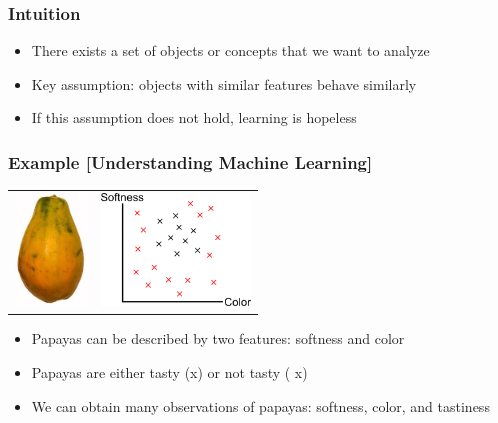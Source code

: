 \documentclass[10pt]{beamer}
\begin{document}
\begin{frame}
  \frametitle{Intuition}
  \begin{itemize}
	\item There exists a set of objects or concepts that we want to analyze
	\item {\color{red} Key assumption}: objects with similar features behave similarly
	\item If this assumption does not hold, learning is hopeless
  \end{itemize}
\end{frame}

\begin{frame}
  \frametitle{Example [Understanding Machine Learning]}
  \begin{center}
  \begin{tabular}{ll}
  \includegraphics[height=3cm]{images/papaya.jpeg} & \includegraphics[height=3cm]{images/papaya1.png}
  \end{tabular}
  \end{center}
  \begin{itemize}
	\item Papayas can be described by two features: softness and color
	\item Papayas are either tasty ({\textsf x}) or not tasty ({\color{red} \textsf x})
	\item We can obtain many {\color{blue} observations} of papayas: softness, color, and tastiness
  \end{itemize}
\end{frame}
\end{document}

